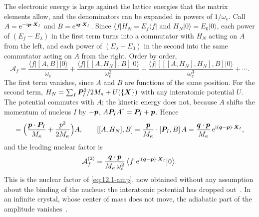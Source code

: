 The electronic energy is large against the lattice energies that the matrix elements allow, and the denominators can be expanded in powers of $1/\omega_e$. Call $A = \mathrm{e}^{-\mathrm{i}\bm{p}\cdot\bm{X}_I}$ and $B = \mathrm{e}^{\mathrm{i}\bm{q}\cdot\bm{X}_I}$. Since $\langle f|H_N = E_f\langle f|$ and $H_N|0\rangle = E_0|0\rangle$, each power of $(E_f - E_\lambda)$ in the first term turns into a commutator with $H_N$ acting on $A$ from the left, and each power of $(E_\lambda - E_0)$ in the second into the same commutator acting on $A$ from the right. Order by order,
\begin{equation}
  \mathcal{A}_f = \frac{\langle f|[A,B]|0\rangle}{\omega_e} + \frac{\langle f|[[A,H_N],B]|0\rangle}{\omega_e^2} + \frac{\langle f|[[[A,H_N],H_N],B]|0\rangle}{\omega_e^3} + \cdots .
  \label{eq:12.4-series}
\end{equation}
The first term vanishes, since $A$ and $B$ are functions of the same position. For the second term, $H_N = \sum_I\bm{P}_I^2/2M_\kappa + U(\{\bm{X}\})$ with any interatomic potential $U$. The potential commutes with $A$; the kinetic energy does not, because $A$ shifts the momentum of nucleus $I$ by $-\bm{p}$, $A\bm{P}_IA^\dagger = \bm{P}_I + \bm{p}$. Hence
\begin{equation*}
  [A,H_N] = \Bigl(\frac{\vect{p}\cdot\vect{P}_I}{M_\kappa} + \frac{p^2}{2M_\kappa}\Bigr)A , \qquad
  [[A,H_N],B] = \frac{\vect{p}}{M_\kappa}\cdot[\vect{P}_I,B]\,A = \frac{\vect{q}\cdot\vect{p}}{M_\kappa}\,\ee^{\ii(\vect{q}-\vect{p})\cdot\vect{X}_I} ,
\end{equation*}
and the leading nuclear factor is
\begin{equation}
  \mathcal{A}^{(2)}_f = \frac{\bm{q}\cdot\bm{p}}{M_\kappa\,\omega_e^2}\,\bigl\langle f\big|\mathrm{e}^{\mathrm{i}(\bm{q}-\bm{p})\cdot\bm{X}_I}\big|0\bigr\rangle .
  \label{eq:12.4-lead}
\end{equation}
This is the nuclear factor of \cref{eq:12.1-amp}, now obtained without any assumption about the binding of the nucleus: the interatomic potential has dropped out~\cites[Eq.~(3.6)]{berghaus2023migdal}[Eq.~(21)]{esposito2025migdal}. In an infinite crystal, whose center of mass does not move, the adiabatic part of the amplitude vanishes~\cite{esposito2025migdal}.

